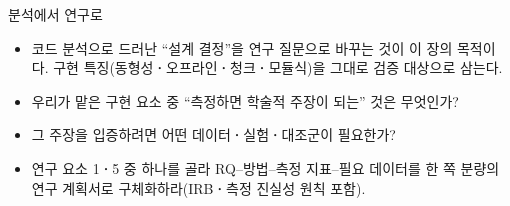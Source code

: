 \begin{teachbox}{분석에서 연구로}
\begin{itemize}
  \item 코드 분석으로 드러난 ``설계 결정''을 연구 질문으로 바꾸는 것이 이 장의 목적이다.
        구현 특징(동형성\textbf{·}오프라인\textbf{·}청크\textbf{·}모듈식)을 그대로 검증 대상으로 삼는다.
\end{itemize}
\begin{itemize}
  \item 우리가 맡은 구현 요소 중 ``측정하면 학술적 주장이 되는'' 것은 무엇인가?
  \item 그 주장을 입증하려면 어떤 데이터\textbf{·}실험\textbf{·}대조군이 필요한가?
\end{itemize}
\begin{itemize}
  \item 연구 요소 1\textbf{·}5 중 하나를 골라 RQ--방법--측정 지표--필요 데이터를 한 쪽 분량의
        연구 계획서로 구체화하라(IRB\textbf{·}측정 진실성 원칙 포함).
\end{itemize}
\end{teachbox}
